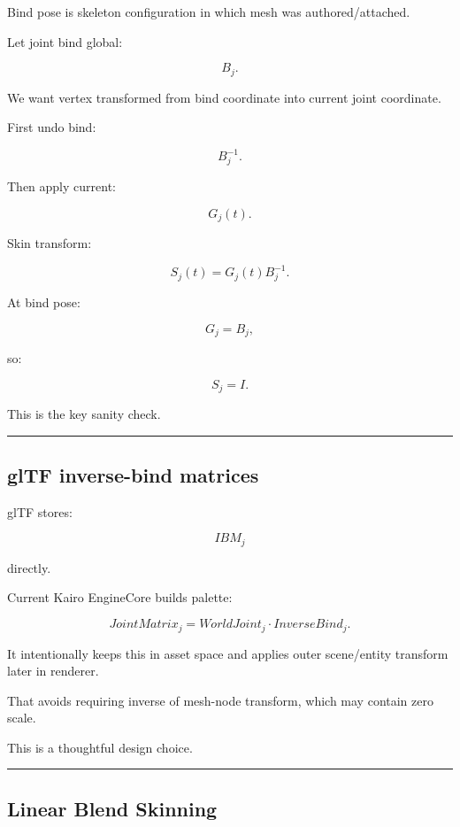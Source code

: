 \hypertarget{04-visual-computing-ii-ch041-bind-pose}{}

Bind pose is skeleton configuration in which mesh was authored/attached.

Let joint bind global:

\[
B_j.
\]

We want vertex transformed from bind coordinate into current joint coordinate.

First undo bind:

\[
B_j^{-1}.
\]

Then apply current:

\[
G_j(t).
\]

Skin transform:

\[
\boxed{
S_j(t)
=
G_j(t)
B_j^{-1}.
}
\]

At bind pose:

\[
G_j=B_j,
\]

so:

\[
S_j=
I.
\]

This is the key sanity check.

\begin{center}\rule{0.5\linewidth}{0.5pt}\end{center}

\subsection{glTF inverse-bind matrices}\label{04-visual-computing-ii-ch041-gltf-inverse-bind-matrices}

\hypertarget{04-visual-computing-ii-ch041-gltf-inverse-bind-matrices}{}

glTF stores:

\[
IBM_j
\]

directly.

Current Kairo EngineCore builds palette:

\[
\boxed{
JointMatrix_j
=
WorldJoint_j
\cdot
InverseBind_j.
}
\]

It intentionally keeps this in asset space and applies outer scene/entity transform later in renderer.

That avoids requiring inverse of mesh-node transform, which may contain zero scale.

This is a thoughtful design choice.

\begin{center}\rule{0.5\linewidth}{0.5pt}\end{center}

\subsection{Linear Blend Skinning}\label{04-visual-computing-ii-ch041-linear-blend-skinning}

